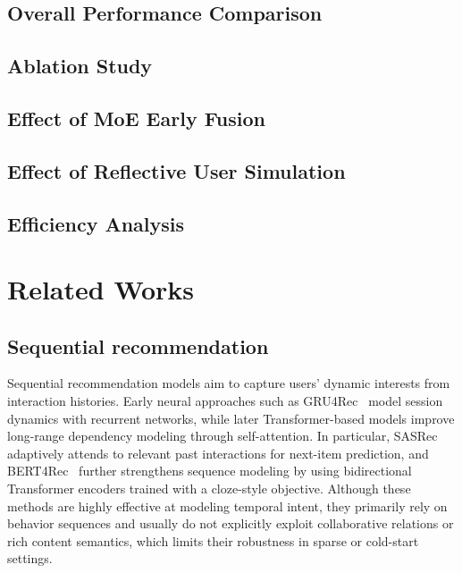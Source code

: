 \documentclass[sigconf,anonymous]{acmart}
\begin{document}
\subsection{Overall Performance Comparison}

\subsection{Ablation Study}

\subsection{Effect of MoE Early Fusion}

\subsection{Effect of Reflective User Simulation}

\subsection{Efficiency Analysis}



\section{Related Works}
\subsection{Sequential recommendation}
Sequential recommendation models aim to capture users' dynamic interests from interaction histories. Early neural approaches such as GRU4Rec~\cite{gru4rec} model session dynamics with recurrent networks, while later Transformer-based models improve long-range dependency modeling through self-attention. In particular, SASRec~\cite{sasrec} adaptively attends to relevant past interactions for next-item prediction, and BERT4Rec~\cite{bert4rec} further strengthens sequence modeling by using bidirectional Transformer encoders trained with a cloze-style objective. Although these methods are highly effective at modeling temporal intent, they primarily rely on behavior sequences and usually do not explicitly exploit collaborative relations or rich content semantics, which limits their robustness in sparse or cold-start settings.
\end{document}

